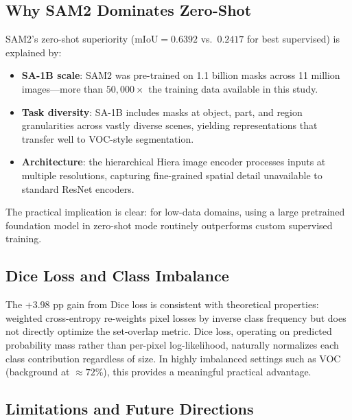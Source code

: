 \documentclass[11pt,a4paper]{article}
\begin{document}
\subsection{Why SAM2 Dominates Zero-Shot}

SAM2's zero-shot superiority ($\text{mIoU} = 0.6392$ vs.\ $0.2417$ for best supervised) is explained by:
\begin{itemize}
  \item \textbf{SA-1B scale}: SAM2 was pre-trained on 1.1 billion masks across 11 million images---more than $50{,}000\times$ the training data available in this study.
  \item \textbf{Task diversity}: SA-1B includes masks at object, part, and region granularities across vastly diverse scenes, yielding representations that transfer well to VOC-style segmentation.
  \item \textbf{Architecture}: the hierarchical Hiera image encoder processes inputs at multiple resolutions, capturing fine-grained spatial detail unavailable to standard ResNet encoders.
\end{itemize}
The practical implication is clear: for low-data domains, using a large pretrained foundation model in zero-shot mode routinely outperforms custom supervised training.

\subsection{Dice Loss and Class Imbalance}

The +3.98 pp gain from Dice loss is consistent with theoretical properties: weighted cross-entropy re-weights pixel losses by inverse class frequency but does not directly optimize the set-overlap metric. Dice loss, operating on predicted probability mass rather than per-pixel log-likelihood, naturally normalizes each class contribution regardless of size. In highly imbalanced settings such as VOC (background at $\approx 72$\%), this provides a meaningful practical advantage.

\subsection{Limitations and Future Directions}
\end{document}
